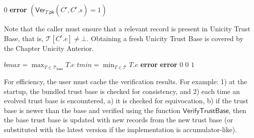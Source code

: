 \begin{algorithmic}[0]
        \State \Return $0$
    \EndIf
      \State \Return \textbf{error}  
    \EndIf
    \State \Return $(\mathsf{Ver}_{T.\mathsf{pk}}(\overline{C^\mathsf{r}}, C^\mathsf{r}.s) = 1)$  
  \EndFunction
\end{algorithmic}

Note that the caller must ensure that a relevant record is present in Unicity Trust Base, that is, $\mathcal{T}[C^\mathsf{r}.e] \ne \bot$. Obtaining a fresh Unicity Trust Base is covered by the Chapter Unicity Anterior.

\begin{algorithmic}[0]

    \State $bmax = \max_{T \in \mathcal{T}_\mathsf{base}} T.e$  
    \State $tmin = \min_{T \in \mathcal{T}} T.e$ 
        \State \Return \textbf{error}  
    \EndIf
          \State \Return \textbf{error}  
       \EndIf
    \EndFor
       
          \State \Return $0$
       \EndIf
    \EndFor
     
          \State \Return $0$
       \EndIf
    \EndFor
    \State \Return $1$
  \EndFunction
\end{algorithmic}

For efficiency, the user must cache the verification results. For example: 1) at the startup, the bundled trust base is checked for consistency, and 2) each time an evolved trust base is encountered, a) it is checked for equivocation, b) if the trust base is newer than the base and verified using the function $\mathsf{VerifyTrustBase}$, then the base trust base is updated with new records from the new trust base (or substituted with the latest version if the implementation is accumulator-like).

